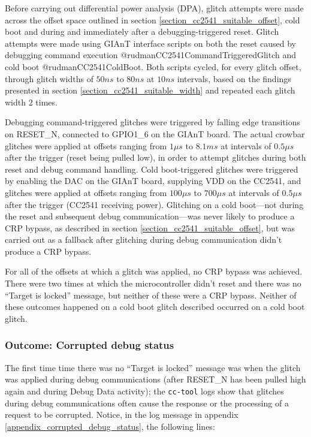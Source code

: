 Before carrying out differential power analysis (DPA), glitch attempts
were made across the offset space outlined in section
\ref{section_cc2541_suitable_offset}, cold boot and during and
immediately after a debugging-triggered reset. Glitch attempts were made
using GIAnT interface scripts on both the reset caused by debugging
command execution @rudmanCC2541CommandTriggeredGlitch and cold boot
@rudmanCC2541ColdBoot. Both scripts cycled, for every glitch offset,
through glitch widths of \(50ns\) to \(80ns\) at \(10ns\) intervals,
based on the findings presented in section
\ref{section_cc2541_suitable_width} and repeated each glitch width 2
times.

Debugging command-triggered glitches were triggered by falling edge
transitions on RESET\_N, connected to GPIO1\_6 on the GIAnT board. The
actual crowbar glitches were applied at offsets ranging from \(1\mu s\)
to \(8.1ms\) at intervals of \(0.5\mu s\) after the trigger (reset being
pulled low), in order to attempt glitches during both reset and debug
command handling. Cold boot-triggered glitches were triggered by
enabling the DAC on the GIAnT board, supplying VDD on the CC2541, and
glitches were applied at offsets ranging from \(100\mu s\) to
\(700\mu s\) at intervals of \(0.5\mu s\) after the trigger (CC2541
receiving power). Glitching on a cold boot---not during the reset and
subsequent debug communication---was never likely to produce a CRP
bypass, as described in section \ref{section_cc2541_suitable_offset},
but was carried out as a fallback after glitching during debug
communication didn't produce a CRP bypass.

For all of the offsets at which a glitch was applied, no CRP bypass was
achieved. There were two times at which the microcontroller didn't reset
and there was no ``Target is locked'' message, but neither of these were
a CRP bypass. Neither of these outcomes happened on a cold boot glitch
described occurred on a cold boot glitch.

\hypertarget{outcome-corrupted-debug-status}{%
\subsubsection{Outcome: Corrupted debug
status}\label{outcome-corrupted-debug-status}}

The first time time there was no ``Target is locked'' message was when
the glitch was applied during debug communications (after RESET\_N has
been pulled high again and during Debug Data activity); the
\texttt{cc-tool} logs show that glitches during debug communications
often cause the response or the processing of a request to be corrupted.
Notice, in the log message in appendix
\ref{appendix_corrupted_debug_status}, the following lines:

